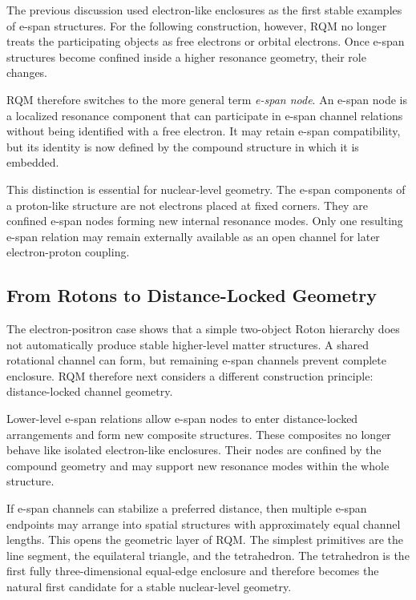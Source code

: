 \documentclass[11pt,a4paper]{article}
\begin{document}
The previous discussion used electron-like enclosures as the first stable examples of e-span structures. For the following construction, however, RQM no longer treats the participating objects as free electrons or orbital electrons. Once e-span structures become confined inside a higher resonance geometry, their role changes.

RQM therefore switches to the more general term \emph{e-span node}. An e-span node is a localized resonance component that can participate in e-span channel relations without being identified with a free electron. It may retain e-span compatibility, but its identity is now defined by the compound structure in which it is embedded.

This distinction is essential for nuclear-level geometry. The e-span components of a proton-like structure are not electrons placed at fixed corners. They are confined e-span nodes forming new internal resonance modes. Only one resulting e-span relation may remain externally available as an open channel for later electron-proton coupling.



\subsection{From Rotons to Distance-Locked Geometry}

The electron-positron case shows that a simple two-object Roton hierarchy does not automatically produce stable higher-level matter structures. A shared rotational channel can form, but remaining e-span channels prevent complete enclosure. RQM therefore next considers a different construction principle: distance-locked channel geometry.

Lower-level e-span relations allow e-span nodes to enter distance-locked arrangements and form new composite structures. These composites no longer behave like isolated electron-like enclosures. Their nodes are confined by the compound geometry and may support new resonance modes within the whole structure.

If e-span channels can stabilize a preferred distance, then multiple e-span endpoints may arrange into spatial structures with approximately equal channel lengths. This opens the geometric layer of RQM. The simplest primitives are the line segment, the equilateral triangle, and the tetrahedron. The tetrahedron is the first fully three-dimensional equal-edge enclosure and therefore becomes the natural first candidate for a stable nuclear-level geometry.
\end{document}
